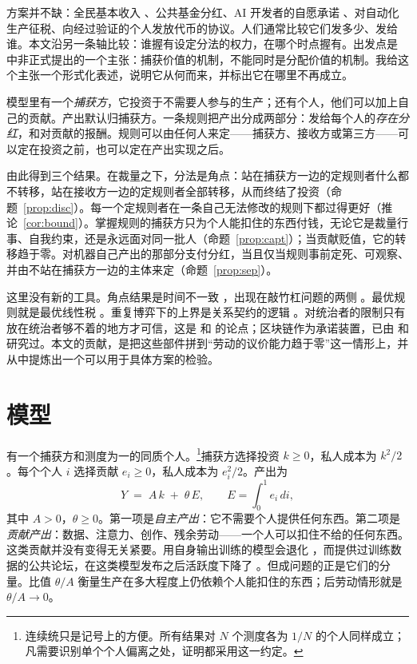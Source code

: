 方案并不缺：全民基本收入 \citep{VanParijs2017}、公共基金分红、AI 开发者的自愿承诺
\citep{OKeefe2020}、对自动化生产征税、向经过验证的个人发放代币的协议。人们通常比较它们发多少、发给谁。本文沿另一条轴比较：谁握有设定分法的权力，在哪个时点握有。出发点是
\citet{Titan2026} 中非正式提出的一个主张：捕获价值的机制，不能同时是分配价值的机制。我给这个主张一个形式化表述，说明它从何而来，并标出它在哪里不再成立。

模型里有一个\emph{捕获方}，它投资于不需要人参与的生产；还有个人，他们可以加上自己的贡献。产出默认归捕获方。一条规则把产出分成两部分：发给每个人的\emph{存在分红}，和对贡献的报酬。规则可以由任何人来定——捕获方、接收方或第三方——可以定在投资之前，也可以定在产出实现之后。

由此得到三个结果。在裁量之下，分法是角点：站在捕获方一边的定规则者什么都不转移，站在接收方一边的定规则者全部转移，从而终结了投资（命题~\ref{prop:disc}）。每一个定规则者在一条自己无法修改的规则下都过得更好（推论~\ref{cor:bound}）。掌握规则的捕获方只为个人能扣住的东西付钱，无论它是裁量行事、自我约束，还是永远面对同一批人（命题~\ref{prop:capt}）；当贡献贬值，它的转移趋于零。对机器自己产出的那部分支付分红，当且仅当规则事前定死、可观察、并由不站在捕获方一边的主体来定（命题~\ref{prop:sep}）。

这里没有新的工具。角点结果是时间不一致 \citep{KydlandPrescott1977,Fischer1980}，出现在敲竹杠问题的两侧 \citep{KleinCrawfordAlchian1978,GrossmanHart1986}。最优规则就是最优线性税
\citep{Sheshinski1972,SaezStantcheva2016}。重复博弈下的上界是关系契约的逻辑
\citep{MacLeodMalcomson1989,Levin2003}。对统治者的限制只有放在统治者够不着的地方才可信，这是 \citet{NorthWeingast1989} 和 \citet{AcemogluRobinson2000} 的论点；区块链作为承诺装置，已由 \citet{CongHe2019} 和 \citet{HoldenMalani2019} 研究过。本文的贡献，是把这些部件拼到“劳动的议价能力趋于零”这一情形上，并从中提炼出一个可以用于具体方案的检验。

\section{模型}

有一个捕获方和测度为一的同质个人。\footnote{连续统只是记号上的方便。所有结果对 $N$ 个测度各为 $1/N$ 的个人同样成立；凡需要识别单个个人偏离之处，证明都采用这一约定。}捕获方选择投资 $k\ge 0$，私人成本为 $k^2/2$。每个个人 $i$ 选择贡献 $e_i\ge 0$，私人成本为
$e_i^2/2$。产出为
\begin{equation}
  Y \;=\; A\,k \;+\; \theta\,E, \qquad E=\int_0^1 e_i\,di ,
\end{equation}
其中 $A>0$，$\theta\ge 0$。第一项是\emph{自主产出}：它不需要个人提供任何东西。第二项是
\emph{贡献产出}：数据、注意力、创作、残余劳动——一个人可以扣住不给的任何东西。这类贡献并没有变得无关紧要。用自身输出训练的模型会退化 \citep{Shumailov2024}，而提供过训练数据的公共论坛，在这类模型发布之后活跃度下降了 \citep{delRioChanona2024}。但成问题的正是它们的分量。比值 $\theta/A$ 衡量生产在多大程度上仍依赖个人能扣住的东西；后劳动情形就是
$\theta/A\to 0$。

